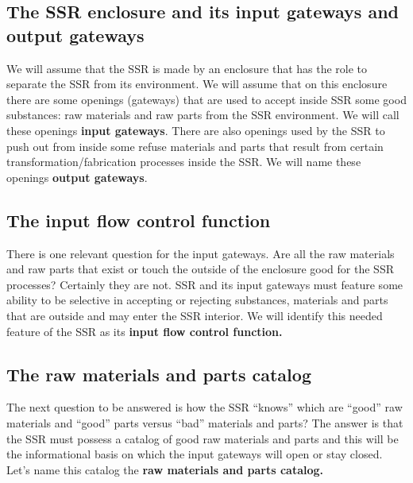 \documentclass[letterpaper]{article}
\begin{document}
\bigskip

\subsection[The SSR enclosure and its input gateways and output
gateways]{The SSR enclosure and its input gateways and output gateways}
\hypertarget{RefHeading3050306210128}{}We will assume that the SSR is
made by an enclosure that has the role to separate the SSR from its
environment. We will assume that on this enclosure there are some
openings (gateways) that are used to accept inside SSR some good
substances: raw materials and raw parts from the SSR environment. We
will call these openings \textbf{input gateways}. There are also
openings used by the SSR to push out from inside some refuse materials
and parts that result from certain transformation/fabrication processes
inside the SSR. We will name these openings \textbf{output gateways}.


\bigskip

\subsection[The input flow control function]{The input flow control
function}
\hypertarget{RefHeading3052306210128}{}There is one relevant question
for the input gateways. Are all the raw materials and raw parts that
exist or touch the outside of the enclosure good for the SSR processes?
Certainly they are not. SSR and its input gateways must feature some
ability to be selective in accepting or rejecting substances, materials
and parts that are outside and may enter the SSR interior. We will
identify this needed feature of the SSR as its \textbf{input flow
control function.}


\bigskip

\subsection[The raw materials and parts catalog]{The raw materials and
parts catalog}
\hypertarget{RefHeading3054306210128}{}The next question to be answered
is how the SSR “knows” which are “good” raw materials and “good” parts
versus “bad” materials and parts? The answer is that the SSR must
possess a catalog of good raw materials and parts and this will be the
informational basis on which the input gateways will open or stay
closed. Let’s name this catalog the \textbf{raw materials and parts
catalog.}
\end{document}
